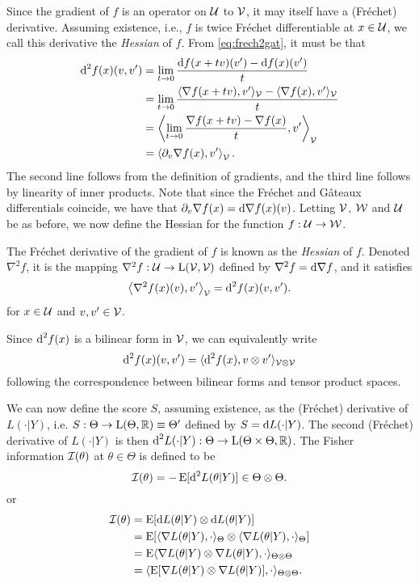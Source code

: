 Since the gradient of $f$ is an operator on ${\mathcal U}$ to ${\mathcal V}$, it may itself have a (Fréchet) derivative.
Assuming existence, i.e., $f$ is twice Fréchet differentiable at $x \in {\mathcal U}$, we call this derivative the \emph{Hessian} of $f$.
From \eqref{eq:frech2gat}, it must be that
\begin{align*}
  \d^2 f(x)(v,v') &= \lim_{t\to 0} \frac{\d f(x + t v)(v') - \d f(x)(v')}{t} \\
  &= \lim_{t\to 0} \frac{\ip{\nabla f(x+tv), v'}_\cV - \ip{\nabla f(x), v'}_\cV}{t} \\
  &= \left\langle \lim_{t\to 0} \frac{\nabla f(x+tv) - \nabla f(x)}{t} , v' \right\rangle_\cV \\%
  &= \left\langle \partial_v \nabla f(x) , v' \right\rangle_\cV.
\end{align*}
The second line follows from the definition of gradients, and the third line follows by linearity of inner products.
Note that since the Fréchet and Gâteaux differentials coincide, we have that $\partial_v \nabla f(x) = \text{d} \nabla f(x) (v)$.
Letting ${\mathcal V}$, ${\mathcal W}$ and ${\mathcal U}$ be as before, we now define the Hessian for the function $f:{\mathcal U} \to {\mathcal W}$.

\begin{definition}[Hessian]
  The Fréchet derivative of the gradient of $f$ is known as the \emph{Hessian} of $f$.
  Denoted $\nabla^2 f$, it is the mapping $\nabla^2 f: {\mathcal U} \to \text{L}({\mathcal V},{\mathcal V})$ defined by $\nabla^2 f  = \text{d} \nabla f$, and it satisfies
  \[
    \left\langle \nabla^2 f(x)(v) , v' \right\rangle_{\mathcal V} = \text{d}^2 f(x)(v,v').
  \]
  for $x\in{\mathcal U}$ and $v,v'\in{\mathcal V}$.
\end{definition}

\begin{remark}
  Since $\text{d}^2 f(x)$ is a bilinear form in ${\mathcal V}$, we can equivalently write
  \[
    \text{d}^2 f(x)(v,v') = \langle\text{d}^2 f(x), v \otimes v'\rangle_{{\mathcal V}\otimes{\mathcal V}}
  \]
  following the correspondence between bilinear forms and tensor product spaces.  
\end{remark}

We can now define the score $S$, assuming existence, as the (Fréchet) derivative of $L(\cdot|Y)$, i.e. $S:\Theta \to \text{L}(\Theta,\mathbb{R}) \equiv \Theta'$ defined by $S = \text{d} L(\cdot | Y)$.
The second (Fréchet) derivative of $L(\cdot|Y)$ is then $\text{d}^2 L(\cdot|Y): \Theta \to \text{L}(\Theta \times \Theta,\mathbb{R})$.
The Fisher information ${\mathcal I}(\theta)$ at $\theta\in\Theta$ is defined to be
\[
  {\mathcal I}(\theta) = -\operatorname{E}[\text{d}^2 L(\theta|Y)] \in \Theta \otimes \Theta.
\]
or 
\begin{align*}
  \cI(\theta) 
  &= \E[\d L(\theta|Y) \otimes \d L(\theta|Y)] \\ %
  &= \E[\ip{\nabla L(\theta|Y), \cdot}_{\Theta} \otimes \ip{\nabla L(\theta|Y), \cdot}_{\Theta}] \\
  &= \E\ip{\nabla L(\theta|Y) \otimes \nabla L(\theta|Y), \cdot}_{\Theta\otimes\Theta} \\
  &= \ip{\E[\nabla L(\theta|Y) \otimes \nabla L(\theta|Y)], \cdot}_{\Theta\otimes\Theta}.
\end{align*}

